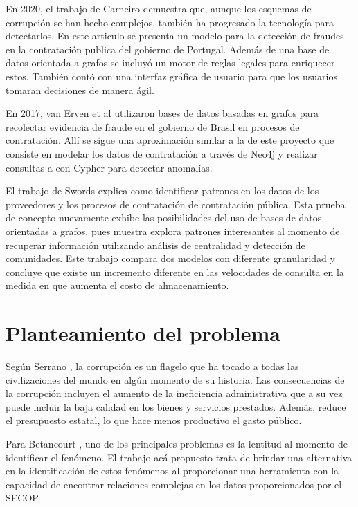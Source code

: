 \documentclass[11pt,letterpaper,oneside]{article}
\begin{document}
	En 2020, el trabajo de Carneiro \cite{Carneiro-2020} demuestra que, aunque los esquemas de corrupción se han hecho complejos, también ha progresado la tecnología para detectarlos. En este articulo se presenta un modelo para la detección de fraudes en la contratación publica del gobierno de Portugal. Además de una base de datos orientada a grafos se incluyó un motor de reglas legales para enriquecer estos. También contó con una interfaz gráfica de usuario para que los usuarios tomaran decisiones de manera ágil.
	
	En 2017, van Erven et al \cite{Erven-2017} utilizaron bases de datos basadas en grafos para recolectar evidencia de fraude en el gobierno de Brasil en procesos de contratación. Allí se sigue una aproximación similar a la de este proyecto que consiste en modelar los datos de contratación a través de Neo4j y realizar consultas a con Cypher para detectar anomalías.
	
	El trabajo de Swords \cite{Swords-2019} explica como identificar patrones en los datos de los proveedores y los procesos de contratación de contratación pública. Esta prueba de concepto nuevamente exhibe las posibilidades del uso de bases de datos orientadas a grafos. pues muestra explora patrones interesantes al momento de recuperar información utilizando análisis de centralidad y detección de comunidades. Este trabajo compara dos modelos con diferente granularidad y concluye que existe un incremento diferente en las velocidades de consulta en la medida en que aumenta el costo de almacenamiento.
	
	\section{Planteamiento del problema}
	Según Serrano \cite{Serrano-2014}, la corrupción es un flagelo que ha tocado a todas las civilizaciones del mundo en algún momento de su historia. Las consecuencias de la corrupción incluyen el aumento de la ineficiencia administrativa que a su vez puede incluir la baja calidad en los bienes y servicios prestados. Además, reduce el presupuesto estatal, lo que hace menos productivo el gasto público.
	
	Para Betancourt \cite{Betancourt-2018}, uno de los principales problemas es la lentitud al momento de identificar el fenómeno. El trabajo acá propuesto trata de brindar una alternativa en la identificación de estos fenómenos al proporcionar una herramienta con la capacidad de encontrar relaciones complejas en los datos proporcionados por el SECOP.
	
\end{document}
